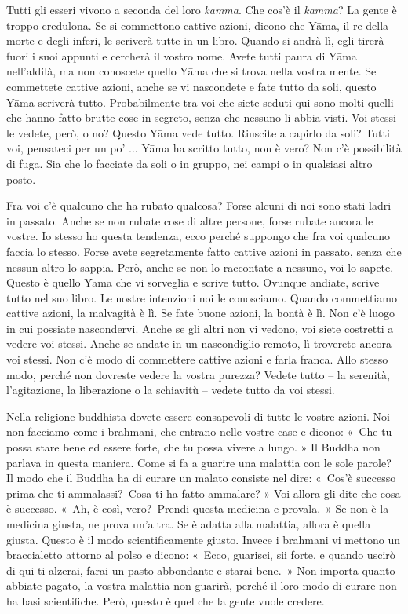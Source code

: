 Tutti gli esseri vivono a seconda del loro \emph{kamma}. Che cos'è il
\emph{kamma}? La gente è troppo credulona. Se si commettono cattive
azioni, dicono che Yāma, il re della morte e degli inferi, le scriverà
tutte in un libro. Quando si andrà lì, egli tirerà fuori i suoi appunti
e cercherà il vostro nome. Avete tutti paura di Yāma nell'aldilà, ma non
conoscete quello Yāma che si trova nella vostra mente. Se commettete
cattive azioni, anche se vi nascondete e fate tutto da soli, questo Yāma
scriverà tutto. Probabilmente tra voi che siete seduti qui sono molti
quelli che hanno fatto brutte cose in segreto, senza che nessuno li
abbia visti. Voi stessi le vedete, però, o no? Questo Yāma vede tutto.
Riuscite a capirlo da soli? Tutti voi, pensateci per un po' ... Yāma ha
scritto tutto, non è vero? Non c'è possibilità di fuga. Sia che lo
facciate da soli o in gruppo, nei campi o in qualsiasi altro posto.

Fra voi c'è qualcuno che ha rubato qualcosa? Forse alcuni di noi sono
stati ladri in passato. Anche se non rubate cose di altre persone, forse
rubate ancora le vostre. Io stesso ho questa tendenza, ecco perché
suppongo che fra voi qualcuno faccia lo stesso. Forse avete segretamente
fatto cattive azioni in passato, senza che nessun altro lo sappia. Però,
anche se non lo raccontate a nessuno, voi lo sapete. Questo è quello
Yāma che vi sorveglia e scrive tutto. Ovunque andiate, scrive tutto nel
suo libro. Le nostre intenzioni noi le conosciamo. Quando commettiamo
cattive azioni, la malvagità è lì. Se fate buone azioni, la bontà è lì.
Non c'è luogo in cui possiate nascondervi. Anche se gli altri non vi
vedono, voi siete costretti a vedere voi stessi. Anche se andate in un
nascondiglio remoto, lì troverete ancora voi stessi. Non c'è modo di
commettere cattive azioni e farla franca. Allo stesso modo, perché non
dovreste vedere la vostra purezza? Vedete tutto -- la serenità,
l'agitazione, la liberazione o la schiavitù -- vedete tutto da voi
stessi.

Nella religione buddhista dovete essere consapevoli di tutte le vostre
azioni. Noi non facciamo come i brahmani, che entrano nelle vostre case
e dicono: «~Che tu possa stare bene ed essere forte, che tu possa vivere
a lungo. » Il Buddha non parlava in questa maniera. Come si fa a guarire
una malattia con le sole parole? Il modo che il Buddha ha di curare un
malato consiste nel dire: «~Cos'è successo prima che ti ammalassi?~Cosa
ti ha fatto ammalare? » Voi allora gli dite che cosa è successo. «~Ah, è
così, vero?~Prendi questa medicina e provala.~» Se non è la medicina
giusta, ne prova un'altra. Se è adatta alla malattia, allora è quella
giusta. Questo è il modo scientificamente giusto. Invece i brahmani vi
mettono un braccialetto attorno al polso e dicono: «~Ecco, guarisci, sii
forte, e quando uscirò di qui ti alzerai, farai un pasto abbondante e
starai bene.~» Non importa quanto abbiate pagato, la vostra malattia non
guarirà, perché il loro modo di curare non ha basi scientifiche. Però,
questo è quel che la gente vuole credere.

